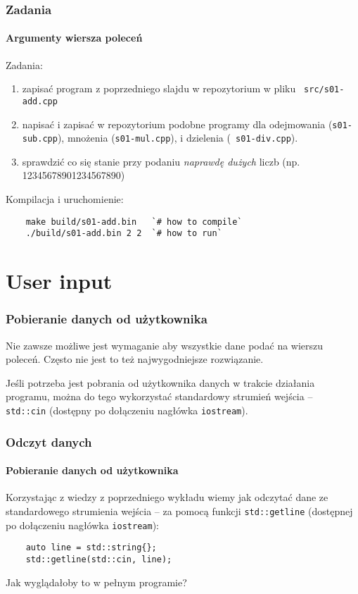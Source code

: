 \documentclass[aspectratio=169]{beamer}
\begin{document}
\begin{frame}[fragile]
    \frametitle{Zadania}
    \framesubtitle{Argumenty wiersza poleceń}

    Zadania:
    \label{lecture_exercise_2}

    \begin{enumerate}
    \item zapisać program z poprzedniego slajdu w repozytorium w pliku {\tt
        src/s01-add.cpp}
    \item napisać i zapisać w repozytorium podobne programy dla odejmowania
        ({\tt s01-sub.cpp}), mnożenia ({\tt s01-mul.cpp}), i dzielenia ({\tt
        s01-div.cpp}).
    \item sprawdzić co się stanie przy podaniu \emph{naprawdę dużych} liczb (np.
        12345678901234567890)
    \end{enumerate}

    Kompilacja i uruchomienie:
    {\footnotesize
    \begin{lstlisting}
    make build/s01-add.bin   `# how to compile`
    ./build/s01-add.bin 2 2  `# how to run`
    \end{lstlisting}}
\end{frame}

\section{User input}

\begin{frame}
    \frametitle{Pobieranie danych od użytkownika}

    Nie zawsze możliwe jest wymaganie aby wszystkie dane podać na wierszu
    poleceń. Często nie jest to też najwygodniejsze rozwiązanie.

    Jeśli potrzeba jest pobrania od użytkownika danych w trakcie działania
    programu, można do tego wykorzystać standardowy strumień wejścia -- {\tt
    std::cin} (dostępny po dołączeniu nagłówka {\tt iostream}).
\end{frame}

\begin{frame}[fragile]
    \frametitle{Odczyt danych}
    \framesubtitle{Pobieranie danych od użytkownika}

    Korzystając z wiedzy z poprzedniego wykładu wiemy jak odczytać dane ze
    standardowego strumienia wejścia -- za pomocą funkcji {\tt std::getline}
    (dostępnej po dołączeniu nagłówka {\tt iostream}):

    \begin{lstlisting}
    auto line = std::string{};
    std::getline(std::cin, line);
    \end{lstlisting}

    Jak wyglądałoby to w pełnym programie?
\end{frame}
\end{document}
